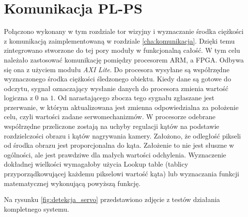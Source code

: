 \section{Komunikacja PL-PS}
\label{komunikacjapl-ps}

Połączono wykonany w tym rozdziale tor wizyjny i wyznaczanie środka ciężkości z komunikacją zaimplementowaną w rozdziale \ref{cha:komunikacja}.
Dzięki temu zintegrowano stworzone do tej pory moduły w funkcjonalną całość.
W tym celu należało zastosować komunikację pomiędzy procesorem ARM, a FPGA.
Odbywa się ona z użyciem modułu \textit{AXI Lite}.
Do procesora wysyłane są współrzędne wyznaczonego środka ciężkości śledzonego obiektu. 
Kiedy dane są gotowe do odczytu, sygnał oznaczający wysłanie danych do procesora zmienia wartość logiczna z \(0\) na \(1\).
Od narastającego zbocza tego sygnału zgłaszane jest przerwanie, w którym aktualizowana jest zmienna odpowiedzialna za położenie celu, czyli wartości zadane serwomechanizmów. 
W procesorze odebrane współrzędne przeliczone zostają na uchyby regulacji kątów na podstawie rozdzielczości obrazu i kątów nagrywania kamery. 
Założono, że odległość pikseli od środka obrazu jest proporcjonalna do kąta.
Założenie to nie jest słuszne w ogólności, ale jest prawdziwe dla małych wartości odchylenia.
Wyznaczenie dokładnej wielkości wymagałoby użycia Lookup table (tablicy przyporządkowującej każdemu pikselowi wartość kąta) lub wyznaczania funkcji matematycznej wykonującą powyższą funkcję.



\newpage
Na rysunku \ref{fig:detekcja_servo} przedstawiono zdjęcie z testów działania kompletnego systemu. 

